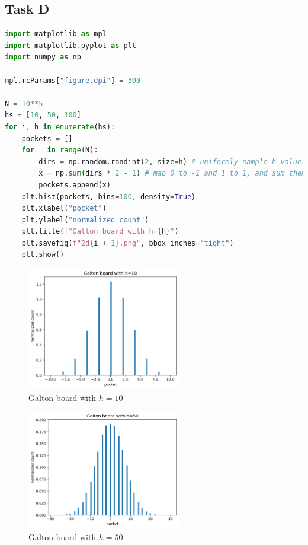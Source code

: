 \subsection*{Task D}
\begin{lstlisting}[language=Python, caption={Python code to implement Galton board and plot their histograms for $h=10,50,100$}, label=lst:galton]
import matplotlib as mpl
import matplotlib.pyplot as plt
import numpy as np

mpl.rcParams["figure.dpi"] = 300

N = 10**5
hs = [10, 50, 100]
for i, h in enumerate(hs):
    pockets = []
    for _ in range(N):
        dirs = np.random.randint(2, size=h) # uniformly sample h values from {0, 1}
        x = np.sum(dirs * 2 - 1) # map 0 to -1 and 1 to 1, and sum them to get final pocket
        pockets.append(x)
    plt.hist(pockets, bins=100, density=True)
    plt.xlabel("pocket")
    plt.ylabel("normalized count")
    plt.title(f"Galton board with h={h}")
    plt.savefig(f"2d{i + 1}.png", bbox_inches="tight")
    plt.show()
\end{lstlisting}
\begin{figure}[H]
	\centering
	\includegraphics[width=0.6\textwidth]{img/2d1.png}
	\caption{Galton board with $h=10$}
\end{figure}
\begin{figure}[H]
	\centering
	\includegraphics[width=0.6\textwidth]{img/2d2.png}
	\caption{Galton board with $h=50$}
\end{figure}
